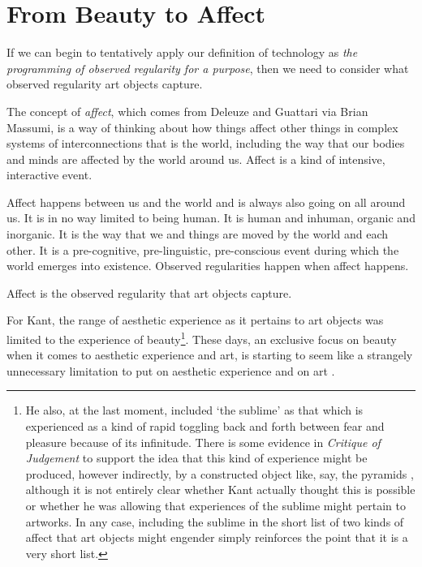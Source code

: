 \documentclass[letterpaper]{article}
\begin{document}
\section{From Beauty to Affect}

    If we can begin to tentatively apply our definition of technology as \emph{the programming of observed regularity for a purpose}, then we need to consider what observed regularity art objects capture.

    The concept of \emph{affect}, which comes from Deleuze and Guattari via Brian Massumi, is a way of thinking about how things affect other things in complex systems of interconnections that is the world, including the way that our bodies and minds are affected by the world around us. Affect is a kind of intensive, interactive event.
    
    Affect happens between us and the world and is always also going on all around us. It is in no way limited to being human. It is human and inhuman, organic and inorganic. It is the way that we and things are moved by the world and each other. It is a pre-cognitive, pre-linguistic, pre-conscious event during which the world emerges into existence. Observed regularities happen when affect happens.
    
    Affect is the observed regularity that art objects capture.
        
    For Kant, the range of aesthetic experience as it pertains to art objects was limited to the experience of beauty\footnote{
        He also, at the last moment, included ‘the sublime’ \citep[p.15]{ZepkeSblmArt2017} as that which is experienced as a kind of rapid toggling back and forth between fear and pleasure \citep[p.88]{KantCrtqOfJdgmnt} because of its infinitude. There is some evidence in \emph{Critique of Judgement} to support the idea that this kind of experience might be produced, however indirectly, by a constructed object like, say, the pyramids \citep[p.82]{KantCrtqOfJdgmnt}, although it is not entirely clear whether Kant actually thought this is possible or whether he was allowing that experiences of the sublime might pertain to artworks. In any case, including the sublime in the short list of two kinds of affect that art objects might engender simply reinforces the point that it is a very short list.

    }. These days, an exclusive focus on beauty when it comes to aesthetic experience and art, is starting to seem like a strangely unnecessary limitation to put on aesthetic experience and on art \citep[pp.121-122]{HighmoreBttrAftrTst2010}. 
        
\end{document}
